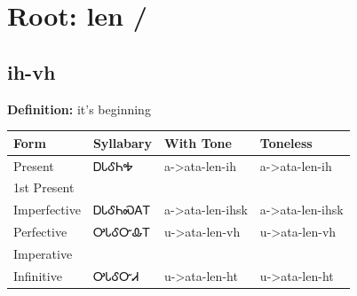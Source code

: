 \documentclass{article}%
\begin{document}
%
\normalsize%
\section*{Root: len / }%
\subsection*{ih-vh}%
\textbf{Definition: }%
it’s beginning%
\\[0.5em]%
\begin{tabular}{|l|l|l|l|}%
\hline%
\textbf{Form}&\textbf{Syllabary}&\textbf{With Tone}&\textbf{Toneless}\\%
\hline%
Present&ᎠᏓᎴᏂᎭ&a{-}>ata{-}len{-}ih&a{-}>ata{-}len{-}ih\\%
1st Present&&&\\%
Imperfective&ᎠᏓᎴᏂᏍᎪᎢ&a{-}>ata{-}len{-}ihsk&a{-}>ata{-}len{-}ihsk\\%
Perfective&ᎤᏓᎴᏅᎲᎢ&u{-}>ata{-}len{-}vh&u{-}>ata{-}len{-}vh\\%
Imperative&&&\\%
Infinitive&ᎤᏓᎴᏅᏗ&u{-}>ata{-}len{-}ht&u{-}>ata{-}len{-}ht\\%
\hline%
\end{tabular}%
\\[1em]%
\end{document}

